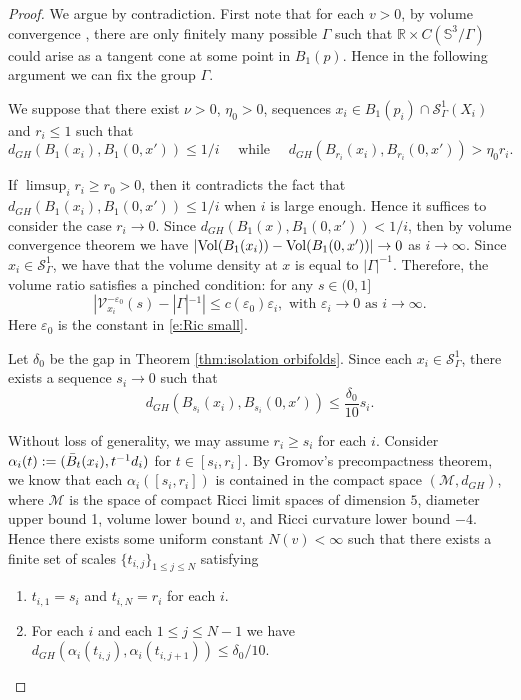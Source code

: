 \documentclass[11pt,reqno]{amsart}
\numberwithin{equation}{section}
\newcommand{\RR}{\mathds{R}}
\newcommand{\Vol}{{\rm Vol}}
\newcommand{\cM}{\mathcal{M}}
\newcommand{\cS}{\mathcal{S}}
\newcommand{\cV}{\mathcal{V}}
\theoremstyle{definition}
\theoremstyle{remark}
\begin{document}
\begin{proof}
We argue by contradiction. First note that for each $v>0$, by volume convergence \cite{col}, there are only finitely many possible $\Gamma$ such that $\RR \times C(\mathbb{S}^3/\Gamma)$ could arise as a tangent cone at some point in $B_1(p)$. Hence in the following argument we can fix the group $\Gamma$. 
    
    
    We suppose that there exist $\nu >0$, $\eta_0>0$, sequences $x_i \in B_1(p_i) \cap \cS^1_{\Gamma}(X_i)$ and $r_i \leqslant 1$ such that
    \begin{equation*}
        d_{GH}(B_1(x_i),B_1(0,x')) \leqslant 1/i \quad \text{ while } \quad d_{GH}(B_{r_i}(x_i), B_{r_i}(0,x')) > \eta_0 r_i.
    \end{equation*}
    
If $\limsup_i r_i \geqslant r_0 > 0$, then it contradicts the fact that $d_{GH}(B_1(x_i),B_1(0,x')) \leqslant 1/i$ when $i$ is large enough. Hence it suffices to consider the case $r_i \to 0$. Since $d_{GH}(B_1(x), B_1(0,x')) < 1/i$, then by volume convergence theorem \cite{col} we have $|\Vol(B_1(x_i)) - \Vol(B_1(0,x'))| \to 0$ as $i \to \infty$. Since $x_i \in \cS^1_{\Gamma}$, we have that the volume density at $x$ is equal to $|\Gamma|^{-1}$. Therefore, the volume ratio satisfies a pinched condition: for any $s\in (0,1]$
\begin{equation}\label{e:Rect;vol pinch}
    |\cV_{x_i}^{-\varepsilon_0}(s) - |\Gamma|^{-1} | \leqslant c(\varepsilon_0) \varepsilon_i, \text{ with } \varepsilon_i \to 0 \text{ as } i \to \infty.  
\end{equation}
Here $\varepsilon_0$ is the constant in \eqref{e:Ric small}.

Let $\delta_0$ be the gap in Theorem \ref{thm:isolation orbifolds}. Since each $x_i \in \cS^1_{\Gamma}$, there exists a sequence $s_i \to 0$ such that 
\begin{equation*}
    d_{GH}(B_{s_i}(x_i),B_{s_i}(0,x')) \leqslant \frac{\delta_0}{10}s_i.
\end{equation*}

Without loss of generality, we may assume $r_i \ge s_i$ for each $i$. Consider $\alpha_{i}(t) := (\Bar{B}_t(x_i), t^{-1}d_i)$ for $t \in [s_i, r_i]$. By Gromov's precompactness theorem, we know that each $\alpha_i([s_i, r_i])$ is contained in the compact space $(\cM,d_{GH})$, where $\cM$ is the space of compact Ricci limit spaces of dimension $5$, diameter upper bound 1, volume lower bound $v$,  and Ricci curvature lower bound $-4$. Hence there exists some uniform constant $N(v) < \infty$ such that there exists a finite set of scales $\{t_{i,j}\}_{1\leqslant j \leqslant N}$ satisfying
    \begin{enumerate}
        \item $t_{i,1} = s_i$ and $t_{i,N} = r_i$ for each $i$.
        \item For each $i$ and each $1\leqslant j \leqslant N-1$ we have $d_{GH}(\alpha_i(t_{i,j}), \alpha_i(t_{i,j+1})) \leqslant \delta_0/10$.
    \end{enumerate}


\end{proof}
\end{document}
